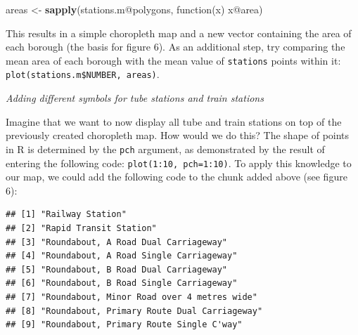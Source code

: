 \documentclass[]{article}
\newenvironment{Shaded}{}{}
\newcommand{\KeywordTok}[1]{\textcolor[rgb]{0.00,0.44,0.13}{\textbf{{#1}}}}
\newcommand{\DataTypeTok}[1]{\textcolor[rgb]{0.56,0.13,0.00}{{#1}}}
\newcommand{\StringTok}[1]{\textcolor[rgb]{0.25,0.44,0.63}{{#1}}}
\newcommand{\CommentTok}[1]{\textcolor[rgb]{0.38,0.63,0.69}{\textit{{#1}}}}
\newcommand{\NormalTok}[1]{{#1}}
\begin{document}
\begin{Shaded}
\begin{Highlighting}[]
\NormalTok{areas <-}\StringTok{ }\KeywordTok{sapply}\NormalTok{(stations.m@polygons, function(x) x@area)}
\end{Highlighting}
\end{Shaded}

This results in a simple choropleth map and a new vector containing the
area of each borough (the basis for figure 6). As an additional step,
try comparing the mean area of each borough with the mean value of
\texttt{stations} points within it:
\texttt{plot(stations.m\$NUMBER, areas)}.

\emph{Adding different symbols for tube stations and train stations}

Imagine that we want to now display all tube and train stations on top
of the previously created choropleth map. How would we do this? The
shape of points in R is determined by the \texttt{pch} argument, as
demonstrated by the result of entering the following code:
\texttt{plot(1:10, pch=1:10)}. To apply this knowledge to our map, we
could add the following code to the chunk added above (see figure 6):

\begin{Shaded}
\end{Shaded}

\begin{verbatim}
## [1] "Railway Station"                           
## [2] "Rapid Transit Station"                     
## [3] "Roundabout, A Road Dual Carriageway"       
## [4] "Roundabout, A Road Single Carriageway"     
## [5] "Roundabout, B Road Dual Carriageway"       
## [6] "Roundabout, B Road Single Carriageway"     
## [7] "Roundabout, Minor Road over 4 metres wide" 
## [8] "Roundabout, Primary Route Dual Carriageway"
## [9] "Roundabout, Primary Route Single C'way"
\end{verbatim}
\end{document}
